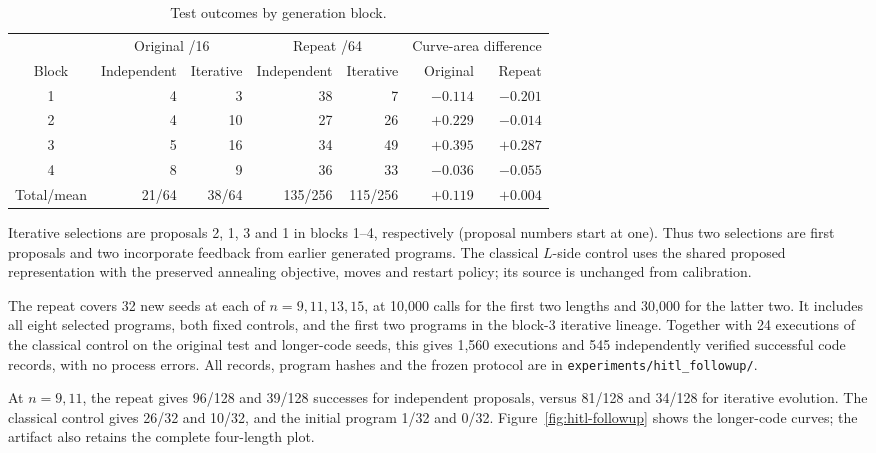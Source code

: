 \begin{table}[!htbp]
\centering\small
\begin{tabular}{crrrrrr}
\toprule
& \multicolumn{2}{c}{Original /16} & \multicolumn{2}{c}{Repeat /64}
& \multicolumn{2}{c}{Curve-area difference}\\
\cmidrule(lr){2-3}\cmidrule(lr){4-5}\cmidrule(lr){6-7}
Block & Independent & Iterative & Independent & Iterative & Original & Repeat\\
\midrule
1 & 4 & 3 & 38 & 7 & $-0.114$ & $-0.201$ \\
2 & 4 & 10 & 27 & 26 & $+0.229$ & $-0.014$ \\
3 & 5 & 16 & 34 & 49 & $+0.395$ & $+0.287$ \\
4 & 8 & 9 & 36 & 33 & $-0.036$ & $-0.055$ \\
\midrule
Total/mean & 21/64 & 38/64 & 135/256 & 115/256 & $+0.119$ & $+0.004$\\
\bottomrule
\end{tabular}
\caption{Test outcomes by generation block.}\label{tab:hitl-blocks}
\end{table}

Iterative selections are proposals 2, 1, 3 and 1 in blocks 1--4,
respectively (proposal numbers start at one). Thus two selections are
first proposals and two incorporate feedback from earlier generated
programs. The classical $L$-side control uses the shared proposed
representation with the preserved annealing objective, moves and
restart policy; its source is unchanged from calibration.

The repeat covers 32 new seeds at each of $n=9,11,13,15$, at 10,000
calls for the first two lengths and 30,000 for the latter two. It
includes all eight selected programs, both fixed controls, and the
first two programs in the block-3 iterative lineage. Together with
24 executions of the classical control on the original test and
longer-code seeds, this gives 1,560 executions and 545 independently
verified successful code records, with no process errors. All records,
program hashes and the frozen protocol are in
\texttt{experiments/hitl\_followup/}.

At $n=9,11$, the repeat gives 96/128 and 39/128 successes for independent
proposals, versus 81/128 and 34/128 for iterative evolution. The classical
control gives 26/32 and 10/32, and the initial program 1/32 and 0/32.
Figure~\ref{fig:hitl-followup} shows the longer-code curves; the artifact
also retains the complete four-length plot.


\FloatBarrier

